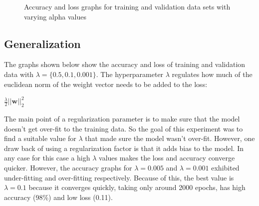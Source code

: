 \documentclass[12pt]{article}
\begin{document}
\begin{figure}[!tbp]
  \hfill
  \hfill
  \caption{Accuracy and loss graphs for training and validation data sets with varying
    alpha values}
\end{figure}

\subsection{Generalization}
The graphs shown below show the accuracy and loss of training and validation data with $\lambda = \{0.5, 0.1, 0.001\}$.
The hyperparameter $\lambda$ regulates how much of the euclidean norm of the weight vector needs to be added to the loss:
\begin{center}
  $\frac{\lambda}{2} ||\mathbf{w}||_2^2$
\end{center}
The main point of a regularization parameter is to make sure that the model doesn't get over-fit to the training data.
So the goal of this experiment was to find a suitable value for $\lambda$ that made sure the model wasn't over-fit.
However, one draw back of using a regularization factor is that it adds bias to the model.
In any case for this case a high $\lambda$ values makes the loss and accuracy converge quicker. However, the accuracy graphs
for $\lambda = 0.005$ and $\lambda = 0.001$ exhibited under-fitting and over-fitting respectively. Because of this, the best value
is $\lambda = 0.1$ because it converges quickly, taking only around 2000 epochs, has high accuracy (98\%) and low loss (0.11).
\end{document}

